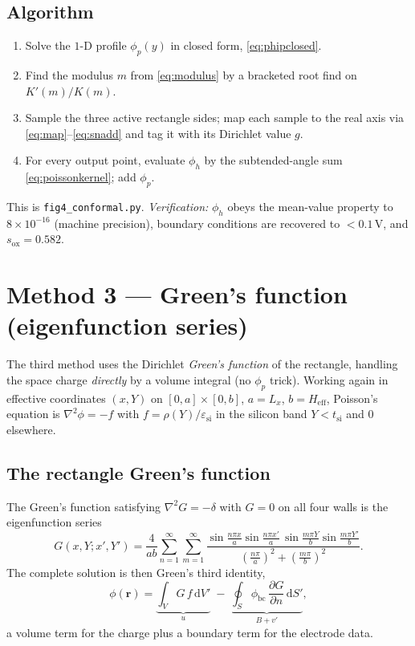 \documentclass[11pt]{article}
\newcommand{\esi}{\varepsilon_{\mathrm{si}}}
\newcommand{\tsi}{t_{\mathrm{si}}}
\newcommand{\Heff}{H_{\mathrm{eff}}}
\newcommand{\Lx}{L_{x}}
\newcommand{\phih}{\phi_{h}}
\newcommand{\phip}{\phi_{p}}
\newcommand{\dd}{\mathrm{d}}
\begin{document}
\subsection{Algorithm}
\begin{enumerate}\itemsep2pt
\item Solve the $1$-D profile $\phip(y)$ in closed form, \eqref{eq:phipclosed}.
\item Find the modulus $m$ from \eqref{eq:modulus} by a bracketed root find on
      $K'(m)/K(m)$.
\item Sample the three active rectangle sides; map each sample to the real axis
      via \eqref{eq:map}--\eqref{eq:snadd} and tag it with its Dirichlet value $g$.
\item For every output point, evaluate $\phih$ by the subtended-angle sum
      \eqref{eq:poissonkernel}; add $\phip$.
\end{enumerate}
This is \texttt{fig4\_conformal.py}. \emph{Verification:} $\phih$ obeys the
mean-value property to $8\times10^{-16}$ (machine precision), boundary conditions
are recovered to $<0.1\,$V, and $s_{\mathrm{ox}}=0.582$.

\section{Method 3 --- Green's function (eigenfunction series)}
The third method uses the Dirichlet \emph{Green's function} of the rectangle,
handling the space charge \emph{directly} by a volume integral (no $\phip$ trick).
Working again in effective coordinates $(x,Y)$ on $[0,a]\times[0,b]$, $a=\Lx$,
$b=\Heff$, Poisson's equation is $\nabla^{2}\phi=-f$ with
$f=\rho(Y)/\esi$ in the silicon band $Y<\tsi$ and $0$ elsewhere.

\subsection{The rectangle Green's function}
The Green's function satisfying $\nabla^{2}G=-\delta$ with $G=0$ on all four walls is
the eigenfunction series
\begin{equation}
G(x,Y;x',Y')=\frac{4}{ab}\sum_{n=1}^{\infty}\sum_{m=1}^{\infty}
\frac{\sin\frac{n\pi x}{a}\sin\frac{n\pi x'}{a}\,
      \sin\frac{m\pi Y}{b}\sin\frac{m\pi Y'}{b}}
     {\left(\frac{n\pi}{a}\right)^{2}+\left(\frac{m\pi}{b}\right)^{2}}.
\label{eq:greenfn}
\end{equation}
The complete solution is then Green's third identity,
\begin{equation}
\phi(\mathbf r)=\underbrace{\int_{V} G\,f\,\dd V'}_{u}\;-\;
\underbrace{\oint_{S}\phi_{\text{bc}}\,\frac{\partial G}{\partial n}\,\dd S'}_{B+v'},
\label{eq:green3rd}
\end{equation}
a volume term for the charge plus a boundary term for the electrode data.
\end{document}
